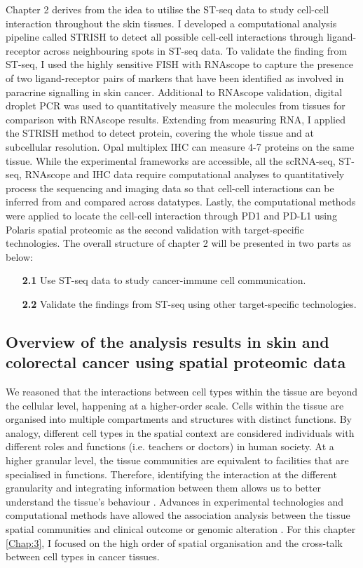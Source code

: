 Chapter 2 derives from the idea to utilise the ST-seq data to study cell-cell interaction throughout the skin tissues. I developed a computational analysis pipeline called STRISH to detect all possible cell-cell interactions through ligand-receptor across neighbouring spots in ST-seq data. To validate the finding from ST-seq, I used the highly sensitive FISH with RNAscope to capture the presence of two ligand-receptor pairs of markers that have been identified as involved in paracrine signalling in skin cancer. Additional to RNAscope validation, digital droplet PCR was used to quantitatively measure the molecules from tissues for comparison with RNAscope results. Extending from measuring RNA, I applied the STRISH method to detect protein, covering the whole tissue and at subcellular resolution. Opal multiplex IHC can measure 4-7 proteins on the same tissue. While the experimental frameworks are accessible, all the scRNA-seq, ST-seq, RNAscope and IHC data require computational analyses to quantitatively process the sequencing and imaging data so that cell-cell interactions can be inferred from and compared across datatypes. Lastly, the computational methods were applied to locate the cell-cell interaction through PD1 and PD-L1 using Polaris spatial proteomic as the second validation with target-specific technologies. The overall structure of chapter 2 will be presented in two parts as below:     
\begin{enumerate}[align=left]
    \item[\textbf{2.1}] Use ST-seq data to study cancer-immune cell communication.
    \item[\textbf{2.2}] Validate the findings from ST-seq using other target-specific technologies.
\end{enumerate}

\subsection{Overview of the analysis results in skin and colorectal cancer using spatial proteomic data}
We reasoned that the interactions between cell types within the tissue are beyond the cellular level, happening at a higher-order scale. Cells within the tissue are organised into multiple compartments and structures with distinct functions. By analogy, different cell types in the spatial context are considered individuals with different roles and functions (i.e. teachers or doctors) in human society. At a higher granular level, the tissue communities are equivalent to facilities that are specialised in functions. Therefore, identifying the interaction at the different granularity and integrating information between them allows us to better understand the tissue's behaviour \cite{schurch2020coordinated}. Advances in experimental technologies and computational methods have allowed the association analysis between the tissue spatial communities and clinical outcome or genomic alteration \cite{schurch2020coordinated, danenberg2022breast}. For this chapter \ref{Chap:3}, I focused on the high order of spatial organisation and the cross-talk between cell types in cancer tissues.


